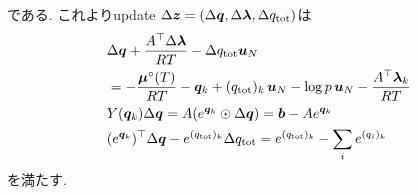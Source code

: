 である. これよりupdate $\Delta \boldsymbol{z} = (\Delta \boldsymbol{q}, \Delta \boldsymbol{\lambda}, \Delta q_\mathrm{tot})$は
\begin{align}
\label{eq:update_tce_1_}
    &\Delta \boldsymbol{q} + \frac{A^\top \Delta \boldsymbol{\lambda}}{RT} - \Delta q_\mathrm{tot} \boldsymbol{u}_N \nonumber \\
    &= -\frac{\boldsymbol{\mu}^\circ(T)}{RT} - {\boldsymbol{q}}_k + (q_\mathrm{tot})_k \, \boldsymbol{u}_N - \log{p} \, \boldsymbol{u}_N  - \frac{A^\top \boldsymbol{\lambda}_k}{RT} \\
\label{eq:update_tce_2_}
    &Y({\boldsymbol{q}}_k) \Delta \boldsymbol{q} = A (e^{\boldsymbol{q}_k} \odot \Delta \boldsymbol{q}) = \boldsymbol{b} - A e^{\boldsymbol{q}_k} \\
\label{eq:update_tce_3_}
    &(e^{\boldsymbol{q}_k})^\top \Delta \boldsymbol{q}  - e^{(q_\mathrm{tot})_k} \Delta q_\mathrm{tot} = e^{(q_\mathrm{tot})_k} - \sum_i {e^{(q_i)_k}} 
\end{align}
を満たす. 

